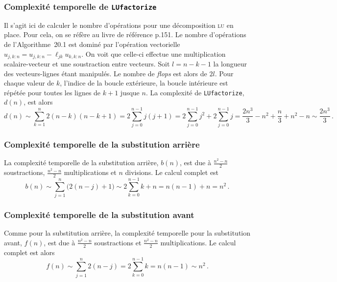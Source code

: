 \documentclass[11pt]{article}
\begin{document}
\subsubsection{Complexité temporelle de \texttt{LUfactorize}}
Il s'agit ici de calculer le nombre d'opérations pour une décomposition \textsc{lu} en place. Pour cela, on se réfère au livre de référence p.151.
Le nombre d'opérations de l'Algorithme~20.1 est dominé par l'opération vectorielle $u_{j, k:n} = u_{j, k:n} - \ell_{jk} u_{k, k:n}$.
On voit que celle-ci effectue une multiplication scalaire-vecteur et une soustraction entre vecteurs.
Soit $l = n - k - 1$ la longueur des vecteurs-lignes étant manipulés. Le nombre de \emph{flops} est alors de $2l$.
Pour chaque valeur de $k$, l'indice de la boucle extérieure, la boucle intérieure est répétée pour toutes les lignes de $k+1$ jusque $n$.
La complexité de \lstinline|LUfactorize|, $d(n)$, est alors
\[
d(n) \sim \sum_{k=1}^{n} 2 (n - k) (n - k + 1) = 2 \sum_{j=0}^{n-1} j (j+1) = 2 \sum_{j=0}^{n-1} j^2  + 2 \sum_{j=0}^{n-1} j = \frac{2 n^3}{3} - n^2 + \frac{n}{3} + n^2 - n \sim \frac{2 n^3}{3}\,. 
\]
\subsubsection{Complexité temporelle de la substitution arrière}
La complexité temporelle de la substitution arrière, $b(n)$, est due à $\frac{n^2 - n}{2}$ soustractions, $\frac{n^2 - n}{2}$ multiplications et $n$ divisions. Le calcul complet est
\[
b(n) \sim \sum_{j=1}^{n} \big(2(n - j) + 1 \big) \sim 2 \sum_{k=0}^{n-1} k + n = n (n - 1) + n = n^2\,.
\]

\subsubsection{Complexité temporelle de la substitution avant}
Comme pour la substitution arrière, la complexité temporelle pour la substitution avant, $f(n)$, est due à $\frac{n^2 - n}{2}$ soustractions et $\frac{n^2 - n}{2}$ multiplications.
Le calcul complet est alors
\[
f(n) \sim \sum_{j=1}^{n} 2(n-j) = 2 \sum_{k=0}^{n-1} k = n (n-1) \sim n^2\,.
\]
\end{document}
